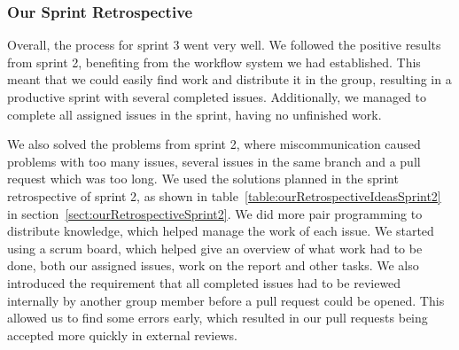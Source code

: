 \subsubsection{Our Sprint Retrospective}
Overall, the process for sprint 3 went very well. We followed the positive results from sprint 2, benefiting from the workflow system we had established. This meant that we could easily find work and distribute it in the group, resulting in a productive sprint with several completed issues. Additionally, we managed to complete all assigned issues in the sprint, having no unfinished work.

We also solved the problems from sprint 2, where miscommunication caused problems with too many issues, several issues in the same branch and a pull request which was too long. 
We used the solutions planned in the sprint retrospective of sprint 2, as shown in table~\ref{table:ourRetrospectiveIdeasSprint2} in section~\ref{sect:ourRetrospectiveSprint2}. 
We did more pair programming to distribute knowledge, which helped manage the work of each issue. 
We started using a scrum board, which helped give an overview of what work had to be done, both our assigned issues, work on the report and other tasks. 
We also introduced the requirement that all completed issues had to be reviewed internally by another group member before a pull request could be opened. This allowed us to find some errors early, which resulted in our pull requests being accepted more quickly in external reviews. 

